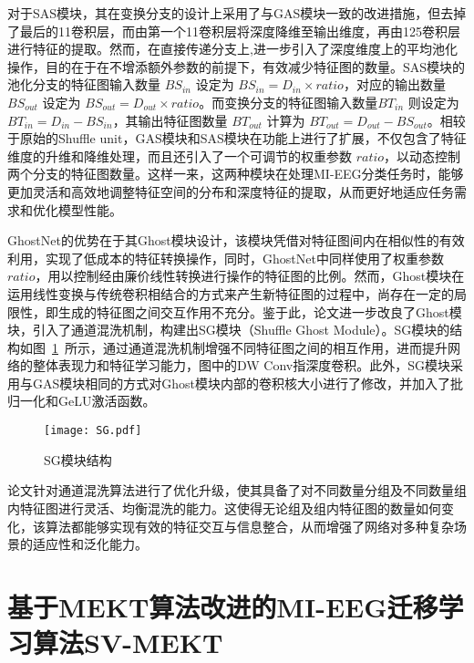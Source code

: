 对于SAS模块，其在变换分支的设计上采用了与GAS模块一致的改进措施，但去掉了最后的1\times1卷积层，而由第一个1\times1卷积层将深度降维至输出维度，再由1\times25卷积层进行特征的提取。然而，在直接传递分支上,进一步引入了深度维度上的平均池化操作，目的在于在不增添额外参数的前提下，有效减少特征图的数量。SAS模块的池化分支的特征图输入数量 \(BS_{in}\) 设定为 \(BS_{in} = D_{in} \times ratio\)，对应的输出数量 \(BS_{out}\) 设定为 \(BS_{out} = D_{out} \times ratio\)。而变换分支的特征图输入数量\(BT_{in}\) 则设定为 \(BT_{in} = D_{in} - BS_{in}\)，其输出特征图数量 \(BT_{out}\) 计算为 \(BT_{out} = D_{out} - BS_{out}\)。相较于原始的Shuffle unit，GAS模块和SAS模块在功能上进行了扩展，不仅包含了特征维度的升维和降维处理，而且还引入了一个可调节的权重参数  \(ratio\)，以动态控制两个分支的特征图数量。这样一来，这两种模块在处理MI-EEG分类任务时，能够更加灵活和高效地调整特征空间的分布和深度特征的提取，从而更好地适应任务需求和优化模型性能。

GhostNet的优势在于其Ghost模块设计，该模块凭借对特征图间内在相似性的有效利用，实现了低成本的特征转换操作，同时，GhostNet中同样使用了权重参数 \(ratio\)，用以控制经由廉价线性转换进行操作的特征图的比例。然而，Ghost模块在运用线性变换与传统卷积相结合的方式来产生新特征图的过程中，尚存在一定的局限性，即生成的特征图之间交互作用不充分。鉴于此，论文进一步改良了Ghost模块，引入了通道混洗机制，构建出SG模块（Shuffle Ghost Module）。SG模块的结构如图~\ref{fig:sg}~所示，通过通道混洗机制增强不同特征图之间的相互作用，进而提升网络的整体表现力和特征学习能力，图中的DW Conv指深度卷积。此外，SG模块采用与GAS模块相同的方式对Ghost模块内部的卷积核大小进行了修改，并加入了批归一化和GeLU激活函数。
\begin{figure}
    \centering
    \texttt{[image: SG.pdf]}
    \caption{SG模块结构}
    \label{fig:sg}
\end{figure}

论文针对通道混洗算法进行了优化升级，使其具备了对不同数量分组及不同数量组内特征图进行灵活、均衡混洗的能力。这使得无论组及组内特征图的数量如何变化，该算法都能够实现有效的特征交互与信息整合，从而增强了网络对多种复杂场景的适应性和泛化能力。

\section{基于MEKT算法改进的MI-EEG迁移学习算法SV-MEKT}

